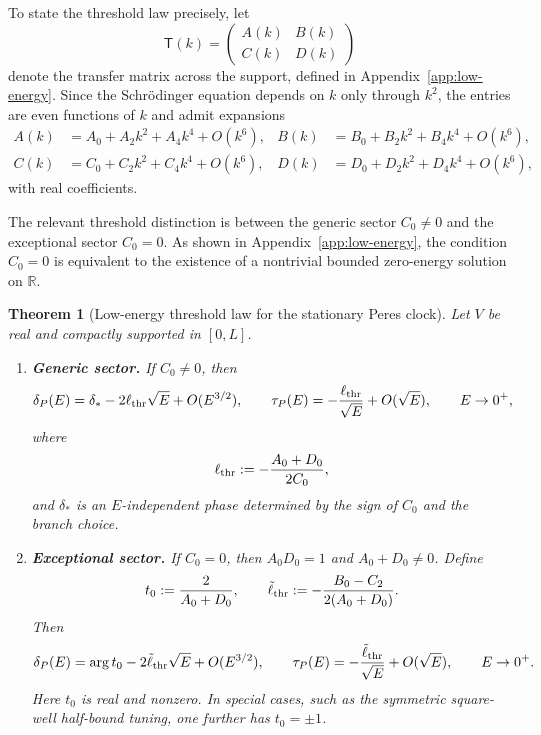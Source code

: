 \documentclass[aps,pra,preprint,notitlepage,nofootinbib]{revtex4-2}
\newtheorem{theorem}{Theorem}
\begin{document}
To state the threshold law precisely, let
\begin{equation}
\mathsf T(k)=
\begin{pmatrix}
A(k) & B(k)\\
C(k) & D(k)
\end{pmatrix}
\end{equation}
denote the transfer matrix across the support, defined in Appendix~\ref{app:low-energy}. Since the Schr\"odinger equation depends on $k$ only through $k^2$, the entries are even functions of $k$ and admit expansions
\begin{align}
A(k)&=A_0+A_2k^2+A_4k^4+O(k^6), &
B(k)&=B_0+B_2k^2+B_4k^4+O(k^6), \nonumber\\
C(k)&=C_0+C_2k^2+C_4k^4+O(k^6), &
D(k)&=D_0+D_2k^2+D_4k^4+O(k^6),
\label{eq:ABCD-main-exp}
\end{align}
with real coefficients.

The relevant threshold distinction is between the generic sector $C_0\neq0$ and the exceptional sector $C_0=0$. As shown in Appendix~\ref{app:low-energy}, the condition $C_0=0$ is equivalent to the existence of a nontrivial bounded zero-energy solution on $\mathbb R$.

\begin{theorem}[Low-energy threshold law for the stationary Peres clock]
\label{thm:general-threshold-body}
Let $V$ be real and compactly supported in $[0,L]$.

\begin{enumerate}[label=(\roman*)]
\item \textbf{Generic sector.} If $C_0\neq0$, then
\begin{equation}
\delta_P(E)=\delta_* -2\ell_{\rm thr}\sqrt{E}+O(E^{3/2}),
\qquad
\tau_P(E)= -\frac{\ell_{\rm thr}}{\sqrt{E}}+O(\sqrt{E}),
\qquad E\to0^+,
\label{eq:tauP-generic-body}
\end{equation}
where
\begin{equation}
\ell_{\rm thr}:=-\frac{A_0+D_0}{2C_0},
\label{eq:ellthr-main}
\end{equation}
and $\delta_*$ is an $E$-independent phase determined by the sign of $C_0$ and the branch choice.

\item \textbf{Exceptional sector.} If $C_0=0$, then $A_0D_0=1$ and $A_0+D_0\neq0$. Define
\begin{equation}
t_0:=\frac{2}{A_0+D_0},
\qquad
\tilde\ell_{\rm thr}:=-\frac{B_0-C_2}{2(A_0+D_0)}.
\label{eq:elltildemain}
\end{equation}
Then
\begin{equation}
\delta_P(E)=\arg t_0 -2\tilde\ell_{\rm thr}\sqrt{E}+O(E^{3/2}),
\qquad
\tau_P(E)= -\frac{\tilde\ell_{\rm thr}}{\sqrt{E}}+O(\sqrt{E}),
\qquad E\to0^+.
\label{eq:tauP-exceptional-body}
\end{equation}
Here $t_0$ is real and nonzero. In special cases, such as the symmetric square-well half-bound tuning, one further has $t_0=\pm1$.
\end{enumerate}
\end{theorem}
\end{document}
